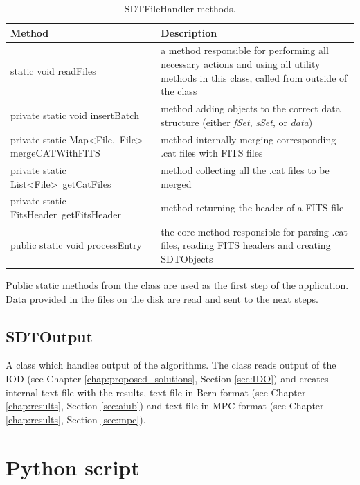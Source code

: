 \begin{table}[H]
\centering
\setlength{\extrarowheight}{2pt}
\begin{tabularx}{\textwidth}{|X|X|}
\hline
\textbf{Method} & \textbf{Description} \\ \hline
static void \mbox{readFiles} & a method responsible for performing all necessary actions and using all utility methods in this class, called from outside of the class \\ \hline
private static void \mbox{insertBatch} & method adding objects to the correct data structure (either \emph{fSet}, \emph{sSet}, or \emph{data}) \\ \hline
private static \mbox{Map<File, File>} \mbox{mergeCATWithFITS} & method internally merging corresponding .cat files with FITS files \\ \hline
private static \mbox{List<File> getCatFiles} & method collecting all the .cat files to be merged \\ \hline
private static \mbox{FitsHeader getFitsHeader} & method returning the header of a FITS file \\ \hline
public static void \mbox{processEntry} & the core method responsible for parsing .cat files, reading FITS headers and creating SDTObjects \\ \hline
\end{tabularx}
\caption{SDTFileHandler methods.}
\label{tab:class_methods_FH}
\end{table}

	Public static methods from the class are used as the first step of the application. Data provided in the files on the disk are read and sent to the next steps.
	
\newpage
	
\subsection{SDTOutput}\label{sec:output}

	A class which handles output of the algorithms. The class reads output of the IOD (see Chapter \ref{chap:proposed_solutions}, Section \ref{sec:IDO}) and creates internal text file with the results, text file in Bern format (see Chapter \ref{chap:results}, Section \ref{sec:aiub}) and text file in MPC format (see Chapter \ref{chap:results}, Section \ref{sec:mpc}).
	

\section{Python script}\label{sec:python_script}

